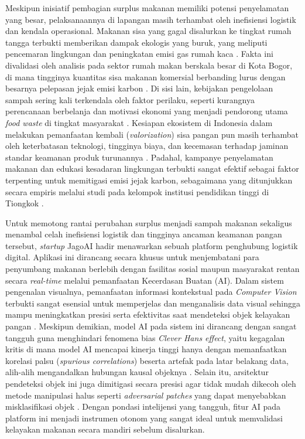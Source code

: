Meskipun inisiatif pembagian surplus makanan memiliki potensi penyelamatan yang besar, pelaksanaannya di lapangan masih terhambat oleh inefisiensi logistik dan kendala operasional. Makanan sisa yang gagal disalurkan ke tingkat rumah tangga terbukti memberikan dampak ekologis yang buruk, yang meliputi pencemaran lingkungan dan peningkatan emisi gas rumah kaca \cite{alliffiyaalkhansyaharsyDampakLimbahMakanan2025c}. Fakta ini divalidasi oleh analisis pada sektor rumah makan berskala besar di Kota Bogor, di mana tingginya kuantitas sisa makanan komersial berbanding lurus dengan besarnya pelepasan jejak emisi karbon \cite{fernandezCarbonFootprintAnalysis2024c}. Di sisi lain, kebijakan pengelolaan sampah sering kali terkendala oleh faktor perilaku, seperti kurangnya perencanaan berbelanja dan motivasi ekonomi yang menjadi pendorong utama \textit{food waste} di tingkat masyarakat \cite{lestariKebijakanPengelolaanSampah2022c}. Kesiapan ekosistem di Indonesia dalam melakukan pemanfaatan kembali (\textit{valorization}) sisa pangan pun masih terhambat oleh keterbatasan teknologi, tingginya biaya, dan kecemasan terhadap jaminan standar keamanan produk turunannya \cite{immawanFoodWasteIndonesia2024a}. Padahal, kampanye penyelamatan makanan dan edukasi kesadaran lingkungan terbukti sangat efektif sebagai faktor terpenting untuk memitigasi emisi jejak karbon, sebagaimana yang ditunjukkan secara empiris melalui studi pada kelompok institusi pendidikan tinggi di Tiongkok \cite{qianFoodWasteAssociated2022a}.

Untuk memotong rantai perubahan surplus menjadi sampah makanan sekaligus menambal celah inefisiensi logistik dan tingginya ancaman keamanan pangan tersebut, \textit{startup} JagoAI hadir menawarkan sebuah platform penghubung logistik digital. Aplikasi ini dirancang secara khusus untuk menjembatani para penyumbang makanan berlebih dengan fasilitas sosial maupun masyarakat rentan secara \textit{real-time} melalui pemanfaatan Kecerdasan Buatan (AI). Dalam sistem pengenalan visualnya, pemanfaatan informasi kontekstual pada \textit{Computer Vision} terbukti sangat esensial untuk memperjelas dan menganalisis data visual sehingga mampu meningkatkan presisi serta efektivitas saat mendeteksi objek kelayakan pangan \cite{jamaliContextObjectDetection2025b}. Meskipun demikian, model AI pada sistem ini dirancang dengan sangat tangguh guna menghindari fenomena bias \textit{Clever Hans effect}, yaitu kegagalan kritis di mana model AI mencapai kinerja tinggi hanya dengan memanfaatkan korelasi palsu (\textit{spurious correlations}) beserta artefak pada latar belakang data, alih-alih mengandalkan hubungan kausal objeknya \cite{pathakUnmaskingCleverHans2026a}. Selain itu, arsitektur pendeteksi objek ini juga dimitigasi secara presisi agar tidak mudah dikecoh oleh metode manipulasi halus seperti \textit{adversarial patches} yang dapat menyebabkan misklasifikasi objek \cite{hopsonStudyAIObject2026b}. Dengan pondasi intelijensi yang tangguh, fitur AI pada platform ini menjadi instrumen otonom yang sangat ideal untuk memvalidasi kelayakan makanan secara mandiri sebelum disalurkan.

